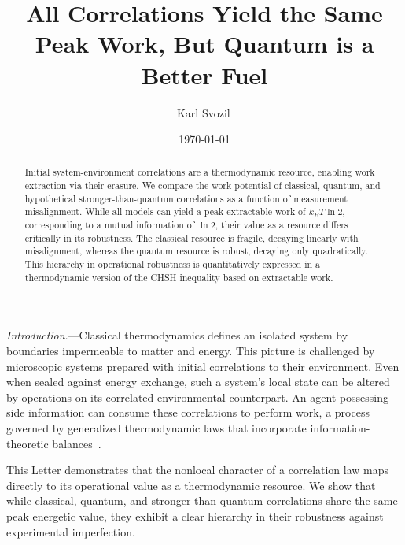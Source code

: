 \documentclass[%
  reprint,
  showpacs,
  showkeys,
  prl,
  floatfix
]{revtex4-2}
\begin{document}
\title{All Correlations Yield the Same Peak Work, But Quantum is a Better Fuel}

\author{Karl Svozil\,}

\date{\today}

\begin{abstract}
Initial system-environment correlations are a thermodynamic resource, enabling work extraction via their erasure. We compare the work potential of classical, quantum, and hypothetical stronger-than-quantum correlations as a function of measurement misalignment. While all models can yield a peak extractable work of $k_B T \ln 2$, corresponding to a mutual information of $\ln 2$, their value as a resource differs critically in its robustness. The classical resource is fragile, decaying linearly with misalignment, whereas the quantum resource is robust, decaying only quadratically. This hierarchy in operational robustness is quantitatively expressed in a thermodynamic version of the CHSH inequality based on extractable work.
\end{abstract}

\maketitle

\textit{Introduction}.---Classical thermodynamics defines an isolated system by boundaries impermeable to matter and energy. This picture is challenged by microscopic systems prepared with initial correlations to their environment. Even when sealed against energy exchange, such a system's local state can be altered by operations on its correlated environmental counterpart. An agent possessing side information can consume these correlations to perform work, a process governed by generalized thermodynamic laws that incorporate information-theoretic balances~\cite{Bera2017a,delrio2011thermodynamic,Sagawa2012}.

This Letter demonstrates that the nonlocal character of a correlation law maps directly to its operational value as a thermodynamic resource. We show that while classical, quantum, and stronger-than-quantum correlations share the same peak energetic value, they exhibit a clear hierarchy in their robustness against experimental imperfection.
\end{document}
